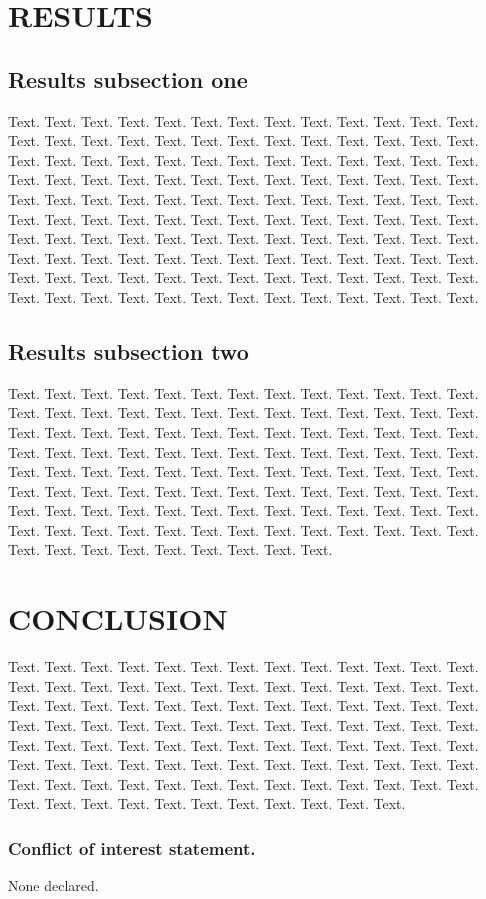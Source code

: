 \documentclass[a4,center,fleqn]{NAR}
\begin{document}
\section{RESULTS}

\subsection{Results subsection one}

Text. Text. Text. Text. Text. Text. Text. Text. Text. Text. Text.
Text. Text. Text. Text. Text. Text. Text. Text. Text. Text. Text.
Text. Text. Text. Text. Text. Text. Text. Text. Text. Text. Text.
Text. Text. Text. Text. Text. Text. Text. Text. Text. Text. Text.
Text. Text. Text. Text. Text. Text. Text. Text. Text. Text. Text.
Text. Text. Text. Text. Text. Text. Text. Text. Text. Text. Text.
Text. Text. Text. Text. Text. Text. Text. Text. Text. Text. Text.
Text. Text. Text. Text. Text. Text. Text. Text. Text. Text. Text.
Text. Text. Text. Text. Text. Text. Text. Text. Text. Text. Text.
Text. Text. Text. Text. Text. Text. Text. Text. Text. Text. Text.
Text. Text. Text. Text. Text. Text. Text. Text. Text. Text. Text.
Text. Text. Text. Text. Text. Text. Text. Text. Text.

\subsection{Results subsection two}

Text. Text. Text. Text. Text. Text. Text. Text. Text. Text. Text.
Text. Text. Text. Text. Text. Text. Text. Text. Text. Text. Text.
Text. Text. Text. Text. Text. Text. Text. Text. Text. Text. Text.
Text. Text. Text. Text. Text. Text. Text. Text. Text. Text. Text.
Text. Text. Text. Text. Text. Text. Text. Text. Text. Text. Text.
Text. Text. Text. Text. Text. Text. Text. Text. Text. Text. Text.
Text. Text. Text. Text. Text. Text. Text. Text. Text. Text. Text.
Text. Text. Text. Text. Text. Text. Text. Text. Text. Text. Text.
Text. Text. Text. Text. Text. Text. Text. Text. Text. Text. Text.
Text. Text. Text. Text. Text. Text. Text. Text. Text. Text. Text.
Text. Text. Text.

\section{CONCLUSION}

Text. Text. Text. Text. Text. Text. Text. Text. Text. Text. Text.
Text. Text. Text. Text. Text. Text. Text. Text. Text. Text. Text.
Text. Text. Text. Text. Text. Text. Text. Text. Text. Text. Text.
Text. Text. Text. Text. Text. Text. Text. Text. Text. Text. Text.
Text. Text. Text. Text. Text. Text. Text. Text. Text. Text. Text.
Text. Text. Text. Text. Text. Text. Text. Text. Text. Text. Text.
Text. Text. Text. Text. Text. Text. Text. Text. Text. Text. Text.
Text. Text. Text. Text. Text. Text. Text. Text. Text. Text. Text.
Text. Text. Text. Text. Text. Text. Text. Text. Text. Text. Text.
Text. Text. Text.

\subsubsection{Conflict of interest statement.} None declared.
\newpage

\nocite{Ayoub2017}
\nocite{BioJava2012}


\end{document}

